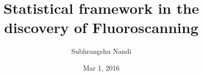 \documentclass[12pt]{article}
\begin{document}
\title{Statistical framework in the discovery of Fluoroscanning}
\author{Subhrangshu Nandi}
\date{Mar 1, 2016}

\maketitle



\newpage



\end{document}
